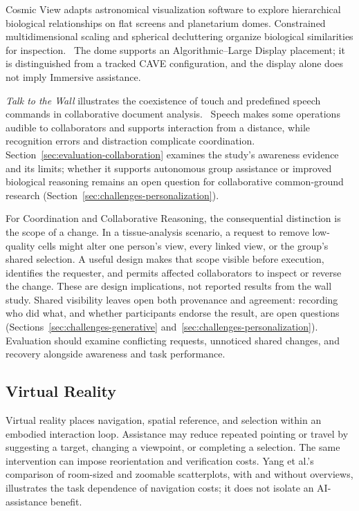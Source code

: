Cosmic View adapts astronomical visualization software to explore hierarchical biological relationships on flat screens and planetarium domes. Constrained multidimensional scaling and spherical decluttering organize biological similarities for inspection.~\cite{NewCosmic2025} The dome supports an Algorithmic--Large Display placement; it is distinguished from a tracked CAVE configuration, and the display alone does not imply Immersive assistance.

\emph{Talk to the Wall} illustrates the coexistence of touch and predefined speech commands in collaborative document analysis.~\cite{EvalMolinaLeon2025} Speech makes some operations audible to collaborators and supports interaction from a distance, while recognition errors and distraction complicate coordination. Section~\ref{sec:evaluation-collaboration} examines the study's awareness evidence and its limits; whether it supports autonomous group assistance or improved biological reasoning remains an open question for collaborative common-ground research (Section~\ref{sec:challenges-personalization}).

For Coordination and Collaborative Reasoning, the consequential distinction is the scope of a change. In a tissue-analysis scenario, a request to remove low-quality cells might alter one person's view, every linked view, or the group's shared selection. A useful design makes that scope visible before execution, identifies the requester, and permits affected collaborators to inspect or reverse the change. These are design implications, not reported results from the wall study. Shared visibility leaves open both provenance and agreement: recording who did what, and whether participants endorse the result, are open questions (Sections~\ref{sec:challenges-generative} and~\ref{sec:challenges-personalization}). Evaluation should examine conflicting requests, unnoticed shared changes, and recovery alongside awareness and task performance.

\subsection{Virtual Reality}
\label{sec:modality-vr}

Virtual reality places navigation, spatial reference, and selection within an embodied interaction loop. Assistance may reduce repeated pointing or travel by suggesting a target, changing a viewpoint, or completing a selection. The same intervention can impose reorientation and verification costs. Yang et al.'s comparison of room-sized and zoomable scatterplots, with and without overviews, illustrates the task dependence of navigation costs; it does not isolate an AI-assistance benefit.~\cite{EvalYang2021}

